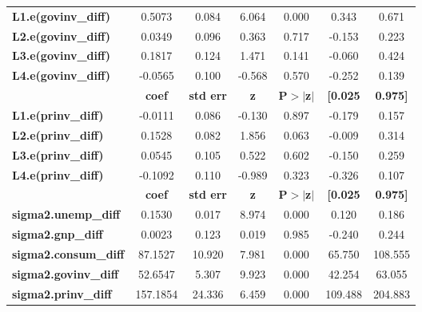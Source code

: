 \documentclass{report}
\begin{document}
\begin{center}
\begin{tabular}{lcccccc}
\midrule
\textbf{L1.e(govinv\_diff)} &       0.5073  &        0.084     &     6.064  &         0.000        &        0.343    &        0.671     \\
\textbf{L2.e(govinv\_diff)} &       0.0349  &        0.096     &     0.363  &         0.717        &       -0.153    &        0.223     \\
\textbf{L3.e(govinv\_diff)} &       0.1817  &        0.124     &     1.471  &         0.141        &       -0.060    &        0.424     \\
\textbf{L4.e(govinv\_diff)} &      -0.0565  &        0.100     &    -0.568  &         0.570        &       -0.252    &        0.139     \\
                           & \textbf{coef} & \textbf{std err} & \textbf{z} & \textbf{P$>$$|$z$|$} & \textbf{[0.025} & \textbf{0.975]}  \\
\midrule
\textbf{L1.e(prinv\_diff)} &      -0.0111  &        0.086     &    -0.130  &         0.897        &       -0.179    &        0.157     \\
\textbf{L2.e(prinv\_diff)} &       0.1528  &        0.082     &     1.856  &         0.063        &       -0.009    &        0.314     \\
\textbf{L3.e(prinv\_diff)} &       0.0545  &        0.105     &     0.522  &         0.602        &       -0.150    &        0.259     \\
\textbf{L4.e(prinv\_diff)} &      -0.1092  &        0.110     &    -0.989  &         0.323        &       -0.326    &        0.107     \\
                             & \textbf{coef} & \textbf{std err} & \textbf{z} & \textbf{P$>$$|$z$|$} & \textbf{[0.025} & \textbf{0.975]}  \\
\midrule
\textbf{sigma2.unemp\_diff}  &       0.1530  &        0.017     &     8.974  &         0.000        &        0.120    &        0.186     \\
\textbf{sigma2.gnp\_diff}    &       0.0023  &        0.123     &     0.019  &         0.985        &       -0.240    &        0.244     \\
\textbf{sigma2.consum\_diff} &      87.1527  &       10.920     &     7.981  &         0.000        &       65.750    &      108.555     \\
\textbf{sigma2.govinv\_diff} &      52.6547  &        5.307     &     9.923  &         0.000        &       42.254    &       63.055     \\
\textbf{sigma2.prinv\_diff}  &     157.1854  &       24.336     &     6.459  &         0.000        &      109.488    &      204.883     \\
\bottomrule
\end{tabular}
\end{center}
\end{document}
